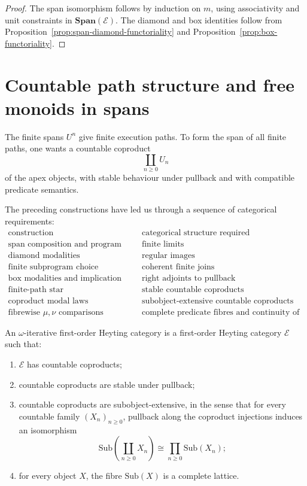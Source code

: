 \begin{proof}
The span isomorphism follows by induction on \(m\), using associativity and unit constraints in \(\mathbf{Span}(\mathcal E)\). The diamond and box identities follow from Proposition~\ref{prop:span-diamond-functoriality} and Proposition~\ref{prop:box-functoriality}.
\end{proof}

\section{Countable path structure and free monoids in spans}
\label{sec:countable-path-structure-free-monoids}

The finite spans \(U^n\) give finite execution paths. To form the span of all finite paths, one wants a countable coproduct
\[
\coprod_{n\ge0}U_n
\]
of the apex objects, with stable behaviour under pullback and with compatible predicate semantics.

The preceding constructions have led us through a sequence of categorical requirements:
\[
\begin{array}{c|c}
\text{construction} & \text{categorical structure required} \\
\hline
\text{span composition and program categories} & \text{finite limits} \\
\text{diamond modalities} & \text{regular images} \\
\text{finite subprogram choice} & \text{coherent finite joins} \\
\text{box modalities and implication tests} & \text{right adjoints to pullback} \\
\text{finite-path star} & \text{stable countable coproducts} \\
\text{coproduct modal laws} & \text{subobject-extensive countable coproducts} \\
\text{fibrewise }\mu,\nu\text{ comparisons} & \text{complete predicate fibres and continuity of the induced transformers}
\end{array}
\]

\begin{definition}
\label{def:omega-iterative-heyting-category}
An \(\omega\)-iterative first-order Heyting category is a first-order Heyting category \(\mathcal E\) such that:
\begin{enumerate}
\item \(\mathcal E\) has countable coproducts;
\item countable coproducts are stable under pullback;
\item countable coproducts are subobject-extensive, in the sense that for every countable family \((X_n)_{n\ge0}\), pullback along the coproduct injections induces an isomorphism
\[
\mathrm{Sub}\left(\coprod_{n\ge0}X_n\right)
\cong
\prod_{n\ge0}\mathrm{Sub}(X_n);
\]
\item for every object \(X\), the fibre \(\mathrm{Sub}(X)\) is a complete lattice.
\end{enumerate}
\end{definition}

